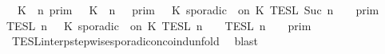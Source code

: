 \begin{isabellebody}
\ {\isacartoucheopen}{\isacharparenleft}{\isasymlbrakk}\ K\ {\isasymUp}\ n\ {\isasymrbrakk}\isactrlsub p\isactrlsub r\isactrlsub i\isactrlsub m\ {\isasyminter}\ {\isasymlbrakk}\ K\ {\isasymDown}\ n\ {\isacharat}\ {\isasymtau}\ {\isasymrbrakk}\isactrlsub p\isactrlsub r\isactrlsub i\isactrlsub m\ {\isasymunion}\ {\isasymlbrakk}\ K\ sporadic\ {\isasymtau}\ on\ K\ {\isasymrbrakk}\isactrlsub T\isactrlsub E\isactrlsub S\isactrlsub L\isactrlbsup {\isasymge}\ Suc\ n\isactrlesup {\isacharparenright}\ {\isasyminter}\ {\isacharparenleft}{\isasymlbrakk}{\isasymlbrakk}\ {\isasymGamma}\ {\isasymrbrakk}{\isasymrbrakk}\isactrlsub p\isactrlsub r\isactrlsub i\isactrlsub m\ {\isasyminter}\ {\isasymlbrakk}{\isasymlbrakk}\ {\isasymPsi}\ {\isasymrbrakk}{\isasymrbrakk}\isactrlsub T\isactrlsub E\isactrlsub S\isactrlsub L\isactrlbsup {\isasymge}\ n\isactrlesup {\isacharparenright}\ {\isacharequal}\ {\isasymlbrakk}\ K\ sporadic\ {\isasymtau}\ on\ K\ {\isasymrbrakk}\isactrlsub T\isactrlsub E\isactrlsub S\isactrlsub L\isactrlbsup {\isasymge}\ n\isactrlesup \ {\isasyminter}\ {\isacharparenleft}{\isasymlbrakk}{\isasymlbrakk}\ {\isasymPsi}\ {\isasymrbrakk}{\isasymrbrakk}\isactrlsub T\isactrlsub E\isactrlsub S\isactrlsub L\isactrlbsup {\isasymge}\ n\isactrlesup \ {\isasyminter}\ {\isasymlbrakk}{\isasymlbrakk}\ {\isasymGamma}\ {\isasymrbrakk}{\isasymrbrakk}\isactrlsub p\isactrlsub r\isactrlsub i\isactrlsub m{\isacharparenright}{\isacartoucheclose}\isanewline
\ \ \ \ \ \ \ \ \isamarkupfalse%
\ TESL{\isacharunderscore}interp{\isacharunderscore}stepwise{\isacharunderscore}sporadicon{\isacharunderscore}coind{\isacharunderscore}unfold\ \isamarkupfalse%
\ blast\isanewline
\ \ \ \ \ \ \isamarkupfalse%
\ \isamarkupfalse%

\end{isabellebody}
